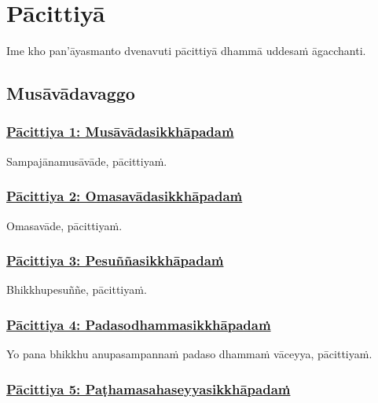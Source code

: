 \section{Pācittiyā}
\label{pc}

\begin{intro}
  Ime kho pan'āyasmanto dvenavuti pācittiyā dhammā uddesaṁ āgacchanti.
\end{intro}

\subsection{Musāvādavaggo}
\vspace{0.2cm}

\subsubsection*{\hyperref[exp1]{Pācittiya 1: Musāvādasikkhāpadaṁ}}
\label{pac1}

Sampajānamusāvāde, pācittiyaṁ.

\subsubsection*{\hyperref[exp2]{Pācittiya 2: Omasavādasikkhāpadaṁ}}
\label{pac2}

Omasavāde, pācittiyaṁ.

\subsubsection*{\hyperref[exp3]{Pācittiya 3: Pesuññasikkhāpadaṁ}}
\label{pac3}

Bhikkhupesuññe, pācittiyaṁ.

\subsubsection*{\hyperref[exp4]{Pācittiya 4: Padasodhammasikkhāpadaṁ}}
\label{pac4}

Yo pana bhikkhu anupasampannaṁ padaso dhammaṁ vāceyya, pācittiyaṁ.

\subsubsection*{\hyperref[exp5]{Pācittiya 5: Paṭhamasahaseyyasikkhāpadaṁ}}
\label{pac5}

